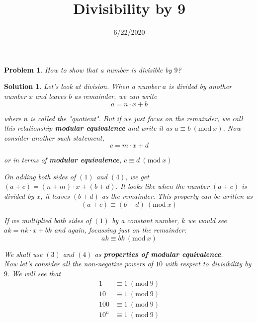 \documentclass{article}
\title{Divisibility by 9}
\date{6/22/2020}
\newtheorem*{problem*}{Problem}
\newtheorem*{solution*}{Solution}
\newcommand{\Mod}[1]{\ (\mathrm{mod}\ #1)}
\begin{document}
\maketitle
 
\begin{problem*}
    How to show that a number is divisible by $9$?
\end{problem*}

\begin{solution*}
    Let's look at division. When a number $a$ is divided by another
    number $x$ and leaves $b$ as remainder, we can write
    \begin{equation}
        a = n \cdot x + b
    \end{equation}
    
    where $n$ is called the "quotient". But if we just focus on the 
    remainder, we call this relationship \textbf{modular equivalence}
    and write it as $a \equiv b \Mod x$. Now consider another such statement,
    \begin{equation}
        c = m \cdot x + d
    \end{equation}

    or in terms of \textbf{modular equivalence},
    $c \equiv d \Mod x$

    On adding both sides of $(1)$ and $(4)$, we get 
    $(a+c) = (n+m) \cdot x + (b+d)$. It looks like
    when the number $(a+c)$ is divided by $x$, it leaves
    $(b+d)$ as the remainder. This property can be written as
    \begin{equation}
        (a+c) \equiv (b+d) \Mod x
    \end{equation}

    If we multiplied both sides of $(1)$ by a constant number, $k$
    we would see $ak = nk \cdot x + bk$ and again, focussing just on the remainder:
    \begin{equation}
        ak \equiv bk \Mod x
    \end{equation}

    We shall use $(3)$ and $(4)$ as \textbf{properties of modular equivalence}.\\

    Now let's consider all the non-negative powers of $10$
    with respect to divisibility by $9$. We will see that
    \begin{align*}
        1 &\equiv 1 \Mod 9\\
        10 &\equiv 1 \Mod 9\\
        100 &\equiv 1 \Mod 9\\
        10^n &\equiv 1 \Mod 9\\
    \end{align*}


\end{solution*}
\end{document}
